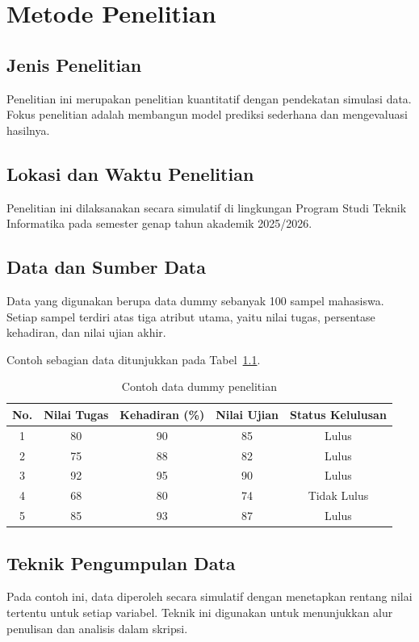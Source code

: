 \documentclass[skripsi]{unnes-ta_plus}
\begin{document}
\chapter{Metode Penelitian}

\section{Jenis Penelitian}
Penelitian ini merupakan penelitian kuantitatif dengan pendekatan simulasi data. Fokus penelitian adalah membangun model prediksi sederhana dan mengevaluasi hasilnya.

\section{Lokasi dan Waktu Penelitian}
Penelitian ini dilaksanakan secara simulatif di lingkungan Program Studi Teknik Informatika pada semester genap tahun akademik 2025/2026.

\section{Data dan Sumber Data}
Data yang digunakan berupa data dummy sebanyak 100 sampel mahasiswa. Setiap sampel terdiri atas tiga atribut utama, yaitu nilai tugas, persentase kehadiran, dan nilai ujian akhir.

Contoh sebagian data ditunjukkan pada Tabel~\ref{tab:data-dummy}.

\begin{table}[H]
    \centering
    \caption{Contoh data dummy penelitian}
    \label{tab:data-dummy}
    \begin{tabular}{ccccc}
        \toprule
        No. & Nilai Tugas & Kehadiran (\%) & Nilai Ujian & Status Kelulusan \\
        \midrule
        1 & 80 & 90 & 85 & Lulus \\
        2 & 75 & 88 & 82 & Lulus \\
        3 & 92 & 95 & 90 & Lulus \\
        4 & 68 & 80 & 74 & Tidak Lulus \\
        5 & 85 & 93 & 87 & Lulus \\
        \bottomrule
    \end{tabular}
\end{table}

\section{Teknik Pengumpulan Data}
Pada contoh ini, data diperoleh secara simulatif dengan menetapkan rentang nilai tertentu untuk setiap variabel. Teknik ini digunakan untuk menunjukkan alur penulisan dan analisis dalam skripsi.
\end{document}
